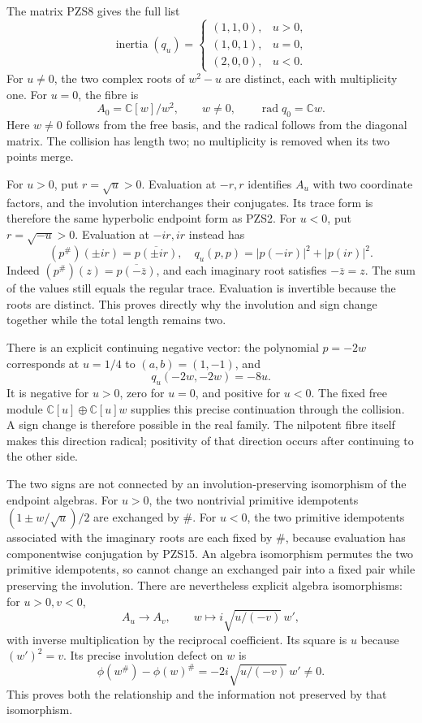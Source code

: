 \documentclass[
  10pt,
  a4paper,
]{article}
\begin{document}
The matrix PZS8 gives the full list \[
\operatorname{inertia}(q_u)=
\begin{cases}
(1,1,0),&u>0,\\
(1,0,1),&u=0,\\
(2,0,0),&u<0.
\end{cases}
\tag{PZS13}
\] For \(u\ne0\), the two complex roots of \(w^2-u\) are distinct, each
with multiplicity one. For \(u=0\), the fibre is \[
A_0=\mathbb C[w]/w^2,
\qquad w\ne0,\qquad \operatorname{rad}q_0=\mathbb Cw.
\tag{PZS14}
\] Here \(w\ne0\) follows from the free basis, and the radical follows
from the diagonal matrix. The collision has length two; no multiplicity
is removed when its two points merge.

For \(u>0\), put \(r=\sqrt u>0\). Evaluation at \(-r,r\) identifies
\(A_u\) with two coordinate factors, and the involution interchanges
their conjugates. Its trace form is therefore the same hyperbolic
endpoint form as PZS2. For \(u<0\), put \(r=\sqrt{-u}>0\). Evaluation at
\(-ir,ir\) instead has \[
(p^\#)(\pm ir)=\overline{p(\pm ir)},
\quad
q_u(p,p)=|p(-ir)|^2+|p(ir)|^2.
\tag{PZS15}
\] Indeed \((p^\#)(z)=\overline{p(-\overline z)}\), and each imaginary
root satisfies \(-\overline z=z\). The sum of the values still equals
the regular trace. Evaluation is invertible because the roots are
distinct. This proves directly why the involution and sign change
together while the total length remains two.

There is an explicit continuing negative vector: the polynomial
\(p=-2w\) corresponds at \(u=1/4\) to \((a,b)=(1,-1)\), and \[
q_u(-2w,-2w)=-8u.
\tag{PZS16}
\] It is negative for \(u>0\), zero for \(u=0\), and positive for
\(u<0\). The fixed free module \(\mathbb C[u]\oplus\mathbb C[u]w\)
supplies this precise continuation through the collision. A sign change
is therefore possible in the real family. The nilpotent fibre itself
makes this direction radical; positivity of that direction occurs after
continuing to the other side.

The two signs are not connected by an involution-preserving isomorphism
of the endpoint algebras. For \(u>0\), the two nontrivial primitive
idempotents \((1\pm w/\sqrt u)/2\) are exchanged by \(\#\). For \(u<0\),
the two primitive idempotents associated with the imaginary roots are
each fixed by \(\#\), because evaluation has componentwise conjugation
by PZS15. An algebra isomorphism permutes the two primitive idempotents,
so cannot change an exchanged pair into a fixed pair while preserving
the involution. There are nevertheless explicit algebra isomorphisms:
for \(u>0,v<0\), \[
A_u\longrightarrow A_v,\qquad
w\longmapsto i\sqrt{u/(-v)}\,w',
\tag{PZS17}
\] with inverse multiplication by the reciprocal coefficient. Its square
is \(u\) because \((w')^2=v\). Its precise involution defect on \(w\) is
\[
\phi(w^\#)-\phi(w)^\#=-2i\sqrt{u/(-v)}\,w'\ne0.
\tag{PZS18}
\] This proves both the relationship and the information not preserved
by that isomorphism.
\end{document}
